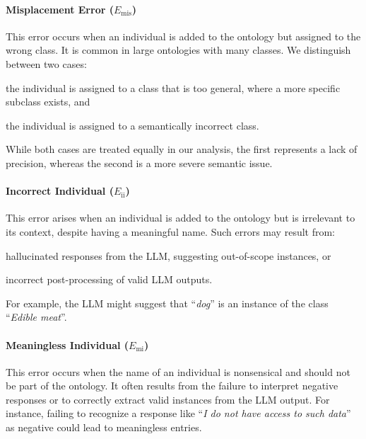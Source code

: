%
\paragraph{Misplacement Error (\(E_{\text{mis}}\))}

This error occurs when an individual is added to the ontology but assigned to the wrong class.
%
It is common in large ontologies with many classes.
%
We distinguish between two cases:
%
\begin{inlinelist}
    \item the individual is assigned to a class that is too general, where a more specific subclass exists, and
    \item the individual is assigned to a semantically incorrect class.
\end{inlinelist}
%
While both cases are treated equally in our analysis, the first represents a lack of precision, whereas the second is a more severe semantic issue.

%
\paragraph{Incorrect Individual (\(E_{\text{ii}}\))}

This error arises when an individual is added to the ontology but is irrelevant to its context, despite having a meaningful name.
%
Such errors may result from:
%
\begin{inlinelist}
    \item hallucinated responses from the \gls{LLM}, suggesting out-of-scope instances, or
    \item incorrect post-processing of valid \gls{LLM} outputs.
\end{inlinelist}
%
For example, the \gls{LLM} might suggest that ``\emph{dog}'' is an instance of the class ``\emph{Edible meat}''.

%
\paragraph{Meaningless Individual (\(E_{\text{mi}}\))}

This error occurs when the name of an individual is nonsensical and should not be part of the ontology.
%
It often results from the failure to interpret negative responses or to correctly extract valid instances from the \gls{LLM} output.
%
For instance, failing to recognize a response like ``\emph{I do not have access to such data}'' as negative could lead to meaningless entries.

